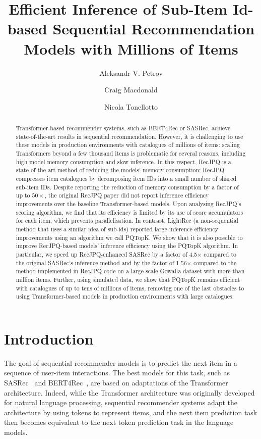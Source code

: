 \documentclass[sigconf,natbib=true, review=False]{acmart} %
\title{Efficient Inference of Sub-Item Id-based Sequential Recommendation Models with Millions of Items}
\author{Aleksandr V. Petrov}
\affiliation{%
  \institution{University of Glasgow} \country{United Kingdom}}
\author{Craig Macdonald}
\affiliation{%
  \institution{University of Glasgow} \country{United Kingdom}}
\author{Nicola Tonellotto}
\affiliation{%
  \institution{University of Pisa} \country{Italy}}
\newcommand{\pageenlarge}[1]{\marginnote{#1}\enlargethispage{#1\baselineskip}}
\newcommand{\rsasha}[1]{\textcolor[HTML]{000000}{#1}}
\newcommand{\gsasha}[1]{\textcolor[HTML]{000000}{#1}}
\newcommand{\scrc}[1]{\textcolor[HTML]{000000}{#1}}
\begin{document}
\begin{abstract}
Transformer-based recommender systems, such as BERT4Rec or SASRec, achieve state-of-the-art results in sequential recommendation. However, it is challenging to use these models in production environments with catalogues of millions of items: scaling Transformers beyond a few thousand items is problematic for several reasons, including high model memory consumption and slow inference.  %
In this respect, RecJPQ is a state-of-the-art method of reducing the \gsasha{models'} memory consumption; RecJPQ compresses item catalogues by decomposing item IDs into a small number of shared sub-item IDs. Despite reporting the reduction of memory consumption by a factor of up to $50\times$, the original RecJPQ paper did not report inference efficiency improvements over the baseline Transformer-based models. 
\gsasha{\scrc{Upon analysing} RecJPQ's scoring algorithm, we find that its efficiency is limited by \scrc{its use of score accumulators for each item}, which \scrc{prevents} parallelisation.} \rsasha{\scrc{In contrast}, LightRec (a non-sequential method that uses a similar idea of sub-ids) reported large inference efficiency improvements using an algorithm we call PQTopK.  We show that it is also possible to improve RecJPQ-based models' inference efficiency using the PQTopK algorithm. } In particular, we speed up RecJPQ-enhanced SASRec by a factor of 4.5$\times$ compared to the original SASRec's inference method and by the factor of  1.56$\times$ compared to the method implemented in RecJPQ code on a large-scale Gowalla dataset with more than million items. Further, using simulated data, we show that PQTopK remains efficient with catalogues of up to tens of millions of items, removing one of the last obstacles to using Transformer-based models in production environments with large catalogues.
\end{abstract}

\maketitle

\section{Introduction} \label{sec:intro}
The goal of sequential recommender models is to predict the next item in a sequence of user-item interactions. The best models for this task, such as SASRec~\cite{SASRec} and BERT4Rec~\cite{BERT4Rec}, are based on adaptations of the Transformer~\cite{Transformer} architecture. 
Indeed, while the \scrc{Transformer} architecture was originally developed for natural language processing, sequential recommender systems adapt the architecture by using tokens to represent items, \rsasha{and \gsasha{the} next item prediction task then becomes equivalent to the next token prediction task in the language models.}
\end{document}
